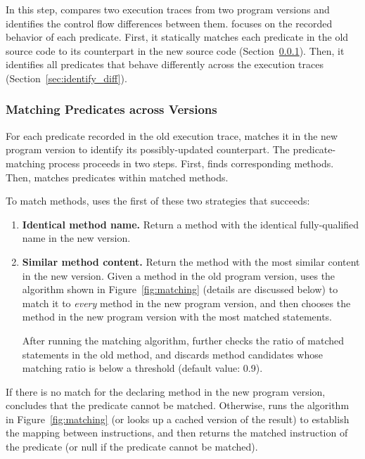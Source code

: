 

In this step, \ourtool compares two execution traces
from two program versions and identifies the
control flow differences between them. \ourtool focuses on the
recorded behavior of each predicate.
First, it statically
matches each predicate in the old
source code to its counterpart in the new source code
(Section~\ref{sec:match_predicate}).
Then, it identifies all predicates that
behave differently across the execution traces (Section~\ref{sec:identify_diff}).


\subsubsection{Matching Predicates across Versions}
\label{sec:match_predicate}

For each predicate recorded in the old execution trace,
\ourtool matches it in the new program version to identify
its possibly-updated counterpart.
The predicate-matching process proceeds in two steps.
First, \ourtool finds corresponding methods.
Then, \ourtool matches predicates within matched methods.

To match methods, \ourtool uses
the first of these two strategies that succeeds:


\vspace{-1mm}

\begin{enumerate}
\item \textbf{Identical method name.} Return a method with the identical
fully-qualified name in the new version.
\item \textbf{Similar method content.} Return the method with
the most similar content in the new version. Given
a method in the old program version, \ourtool
uses the algorithm shown in Figure~\ref{fig:matching}
(details are discussed below) to match it
to \textit{every} method in the new program version, and then
chooses the method in the new program version with the most matched statements.

After running the matching algorithm, \ourtool further checks the ratio of
matched statements in the old method, and discards method candidates whose
matching ratio is below a threshold (default value: 0.9).
\end{enumerate}


If there is no match for the declaring method in the new program
version, \ourtool concludes that the predicate cannot be
matched. Otherwise, \ourtool runs the algorithm
in Figure~\ref{fig:matching} (or looks up a cached version of the result)
to establish the mapping between
instructions, and then returns the matched instruction of the
predicate (or null if the predicate cannot be matched).



